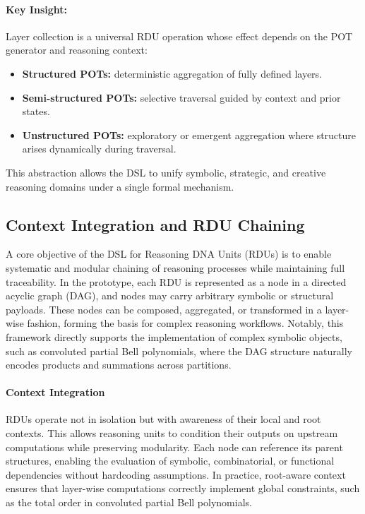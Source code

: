 \documentclass[11pt]{article}
\begin{document}
\paragraph{Key Insight:}  
Layer collection is a universal RDU operation whose effect depends on the POT generator and reasoning context:
\begin{itemize}
    \item \textbf{Structured POTs:} deterministic aggregation of fully defined layers.
    \item \textbf{Semi-structured POTs:} selective traversal guided by context and prior states.
    \item \textbf{Unstructured POTs:} exploratory or emergent aggregation where structure arises dynamically during traversal.
\end{itemize}
This abstraction allows the DSL to unify symbolic, strategic, and creative reasoning domains under a single formal mechanism.


\subsection{Context Integration and RDU Chaining}

A core objective of the DSL for Reasoning DNA Units (RDUs) is to enable systematic and modular chaining of reasoning processes while maintaining full traceability. In the prototype, each RDU is represented as a node in a directed acyclic graph (DAG), and nodes may carry arbitrary symbolic or structural payloads. These nodes can be composed, aggregated, or transformed in a layer-wise fashion, forming the basis for complex reasoning workflows. Notably, this framework directly supports the implementation of complex symbolic objects, such as convoluted partial Bell polynomials, where the DAG structure naturally encodes products and summations across partitions.

\paragraph{Context Integration} RDUs operate not in isolation but with awareness of their local and root contexts. This allows reasoning units to condition their outputs on upstream computations while preserving modularity. Each node can reference its parent structures, enabling the evaluation of symbolic, combinatorial, or functional dependencies without hardcoding assumptions. In practice, root-aware context ensures that layer-wise computations correctly implement global constraints, such as the total order in convoluted partial Bell polynomials.
\end{document}
